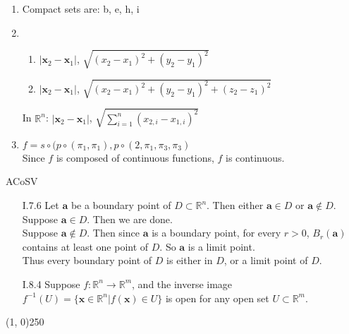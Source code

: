 \documentclass[11pt,letterpaper]{article}
\begin{document}
\begin{enumerate}
\item Compact sets are: b, e, h, i

\item
  \begin{enumerate}
  \item
    $|\mathbf{x}_2-\mathbf{x}_1|$, $\sqrt{(x_2-x_1)^2+(y_2-y_1)^2}$

  \item
    $|\mathbf{x}_2-\mathbf{x}_1|$, $\sqrt{(x_2-x_1)^2+(y_2-y_1)^2+(z_2-z_1)^2}$
  \end{enumerate}
  In $\mathbb{R}^n$: $|\mathbf{x}_2-\mathbf{x}_1|$,
  $\sqrt{\sum_{i=1}^{n}(x_{2,i}-x_{1,i})^2}$

\item
  $f=s\circ(p\circ(\pi_1,\pi_1),p\circ(2,\pi_1,\pi_3,\pi_3)$ \\
  Since $f$ is composed of continuous functions, $f$ is continuous.

\end{enumerate}

\newpage
\noindent
ACoSV

\begin{enumerate}
\item[I.7.6]
  Let $\mathbf{a}$ be a boundary point of $D\subset\mathbb{R}^n$. Then either
  $\mathbf{a}\in D$ or $\mathbf{a}\notin D$. \\
  Suppose $\mathbf{a}\in D$. Then we are done. \\
  Suppose $\mathbf{a}\notin D$. Then since $\mathbf{a}$ is a boundary point,
  for every $r>0$, $B_r(\mathbf{a})$ contains at least one point of $D$. So
  $\mathbf{a}$ is a limit point. \\
  Thus every boundary point of $D$ is either in $D$, or a limit point of $D$.

\item[I.8.4]
  Suppose $f:\mathbb{R}^n\to\mathbb{R}^m$, and the inverse image
  $f^{-1}(U)=\{\mathbf{x}\in\mathbb{R}^n|f(\mathbf{x})\in U\}$ is open for any
  open set $U\subset\mathbb{R}^m$.
\end{enumerate}

\begin{center}
\line(1, 0){250}
\end{center}
\end{document}
